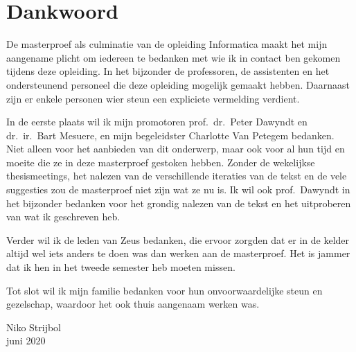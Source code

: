 \chapter*{Dankwoord}\label{ch:dankwoord}

De masterproef als culminatie van de opleiding Informatica maakt het mijn aangename plicht om iedereen te bedanken met wie ik in contact ben gekomen tijdens deze opleiding.
In het bijzonder de professoren, de assistenten en het ondersteunend personeel die deze opleiding mogelijk gemaakt hebben.
Daarnaast zijn er enkele personen wier steun een expliciete vermelding verdient.

In de eerste plaats wil ik mijn promotoren prof.\ dr.\ Peter Dawyndt en dr.\ ir.\ Bart Mesuere, en mijn begeleidster Charlotte Van Petegem bedanken.
Niet alleen voor het aanbieden van dit onderwerp, maar ook voor al hun tijd en moeite die ze in deze masterproef gestoken hebben.
Zonder de wekelijkse thesismeetings, het nalezen van de verschillende iteraties van de tekst en de vele suggesties zou de masterproef niet zijn wat ze nu is.
Ik wil ook prof.\ Dawyndt in het bijzonder bedanken voor het grondig nalezen van de tekst en het uitproberen van wat ik geschreven heb.

Verder wil ik de leden van Zeus  bedanken, die ervoor zorgden dat er in de kelder altijd wel iets anders te doen was dan werken aan de masterproef.
Het is jammer dat ik hen in het tweede semester heb moeten missen.

Tot slot wil ik mijn familie bedanken voor hun onvoorwaardelijke steun en gezelschap, waardoor het ook thuis aangenaam werken was.

\begin{flushright}
    Niko Strijbol\\
    juni 2020
\end{flushright}
